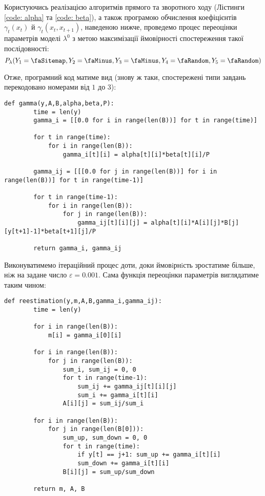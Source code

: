 \vspace{0.4cm}
Користуючись реалізацією алгоритмів прямого та зворотного ходу (Лістинги \ref{code: alpha} та \ref{code: beta}), а також програмою обчислення коефіцієнтів $\gamma_t(x_t)$ й $\gamma_t(x_t, x_{t+1})$, наведеною нижче, проведемо процес переоцінки параметрів моделі $\lambda^0$ з метою максимізації ймовірності спостереження такої послідовності:
\begin{equation*}
    P_\lambda(Y_1=\text{\faSitemap},Y_2=\text{\faMinus},Y_3=\text{\faMinus},Y_4=\text{\faRandom},Y_5=\text{\faRandom})
\end{equation*}

Отже, програмний код матиме вид (знову ж таки, спостережені типи завдань перекодовано номерами від $1$ до $3$):

\vspace{0.4cm}
\begin{lstlisting}[firstnumber=1, label = code: gamma, caption = Обчислення коефіцієнтів $\gamma_t(i)$ та $\gamma_t(i{,}j)$]
    def gamma(y,A,B,alpha,beta,P):
        time = len(y)
        gamma_i = [[0.0 for i in range(len(B))] for t in range(time)]

        for t in range(time):
            for i in range(len(B)):
                gamma_i[t][i] = alpha[t][i]*beta[t][i]/P

        gamma_ij = [[[0.0 for j in range(len(B))] for i in range(len(B))] for t in range(time-1)]

        for t in range(time-1):
            for i in range(len(B)):
                for j in range(len(B)):
                    gamma_ij[t][i][j] = alpha[t][i]*A[i][j]*B[j][y[t+1]-1]*beta[t+1][j]/P

        return gamma_i, gamma_ij
\end{lstlisting}

\vspace{0.4cm}
Виконуватимемо ітераційний процес доти, доки ймовiрнiсть зростатиме більше, нiж на задане число $\varepsilon=0.001$. Сама функція переоцінки параметрів виглядатиме таким чином:

\newpage
\begin{lstlisting}[firstnumber=1, label = code: reestimation, caption = Переоцінення параметрів моделі]
    def reestimation(y,m,A,B,gamma_i,gamma_ij):
        time = len(y)

        for i in range(len(B)):
            m[i] = gamma_i[0][i]

        for i in range(len(B)):
            for j in range(len(B)):
                sum_i, sum_ij = 0, 0
                for t in range(time-1):
                    sum_ij += gamma_ij[t][i][j]
                    sum_i += gamma_i[t][i]
                A[i][j] = sum_ij/sum_i

        for i in range(len(B)):
            for j in range(len(B[0])):
                sum_up, sum_down = 0, 0
                for t in range(time):
                    if y[t] == j+1: sum_up += gamma_i[t][i]
                    sum_down += gamma_i[t][i]
                B[i][j] = sum_up/sum_down

        return m, A, B
\end{lstlisting}

